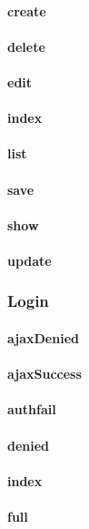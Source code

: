 \documentclass[12pt]{article}
\begin{document}
\paragraph{create}
\paragraph{delete}
\paragraph{edit}
\paragraph{index}
\paragraph{list}
\paragraph{save}
\paragraph{show}
\paragraph{update}

\subsubsection{Login}\label{sec:CLogin}
\paragraph{ajaxDenied}
\paragraph{ajaxSuccess}
\paragraph{authfail}
\paragraph{denied}
\paragraph{index}
\paragraph{full}
\end{document}
